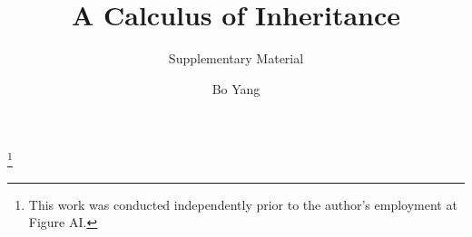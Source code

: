 \title{A Calculus of Inheritance}
\ifInheritanceBody\else
  \subtitle{Supplementary Material}
\fi

\author{Bo Yang}
\thanks{This work was conducted independently prior to the author's employment at Figure AI.}

\ifInheritanceBody
